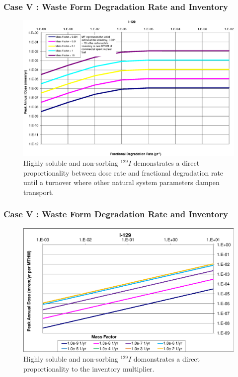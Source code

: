 \begin{frame}[c]
  \frametitle{Case V : Waste Form Degradation Rate and Inventory}
\begin{figure}[ht!]
\centering
\includegraphics[width=\linewidth]{WFDegAndInv/I-129.eps}
\caption{
Highly soluble and non-sorbing $^{129}I$ demonstrates a direct proportionality between dose rate and 
fractional degradation rate until a turnover where other natural system 
parameters dampen transport.} 
\label{fig:WFDegI129}
\end{figure}
\end{frame}

\begin{frame}[c]
  \frametitle{Case V : Waste Form Degradation Rate and Inventory}

\begin{figure}[ht!]
\centering
\includegraphics[width=\linewidth]{WFDegAndInv/I-129-MF.eps}
\caption{
Highly soluble and non-sorbing $^{129}I$ domonstrates a direct 
proportionality to the inventory multiplier.}
\label{fig:WFDegI129MF}
\end{figure}
\end{frame}

